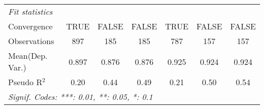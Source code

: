 \begin{tabular}{lcccccc}
   \midrule
   \emph{Fit statistics}\\
   Convergence             &TRUE         & FALSE  & FALSE   & TRUE    & FALSE        & FALSE\\  
   Observations            & 897         & 185    & 185     & 787     & 157          & 157\\  
Mean(Dep. Var.) & 0.897 & 0.876 & 0.876 & 0.925 & 0.924 & 0.924 \\
   Pseudo R$^2$            & 0.20        & 0.44   & 0.49    & 0.21    & 0.50         & 0.54\\  
   \midrule \midrule
   \multicolumn{7}{l}{\emph{Signif. Codes: ***: 0.01, **: 0.05, *: 0.1}}\\
\end{tabular}
\par\endgroup
